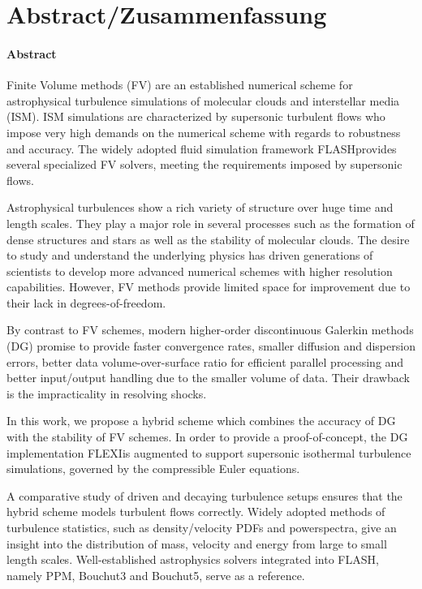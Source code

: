 \section*{Abstract/Zusammenfassung}
\paragraph{Abstract}
Finite Volume methods (FV) are an established numerical scheme for
astrophysical turbulence simulations of molecular clouds and interstellar media
(ISM). ISM simulations are characterized by supersonic turbulent flows who
impose very high demands on the numerical scheme with regards to robustness and
accuracy. The widely adopted fluid simulation framework FLASH\footnotemark provides
several specialized FV solvers, meeting the requirements imposed by supersonic
flows.

Astrophysical turbulences show a rich variety of structure over huge time and
length scales. They play a major role in several processes such as the
formation of dense structures and stars as well as the stability of molecular
clouds. The desire to study and understand the underlying physics has driven
generations of scientists to develop more advanced numerical schemes with
higher resolution capabilities. However, FV methods provide limited space for
improvement due to their lack in degrees-of-freedom.

By contrast to FV schemes, modern higher-order discontinuous Galerkin methods
(DG) promise to provide faster convergence rates, smaller diffusion and
dispersion errors, better data volume-over-surface ratio for efficient parallel
processing and better input/output handling due to the smaller volume of data.
Their drawback is the impracticality in resolving shocks.

In this work, we propose a hybrid scheme which combines the accuracy of DG with
the stability of FV schemes. In order to provide a proof-of-concept, the DG
implementation FLEXI\footnotemark is augmented to support supersonic
isothermal turbulence simulations, governed by the compressible Euler
equations.

A comparative study of driven and decaying turbulence setups ensures that the
hybrid scheme models turbulent flows correctly. Widely adopted methods of
turbulence statistics, such as density/velocity PDFs and powerspectra, give an
insight into the distribution of mass, velocity and energy from large to small
length scales. Well-established astrophysics solvers integrated into FLASH,
namely PPM, Bouchut3 and Bouchut5, serve as a reference.

